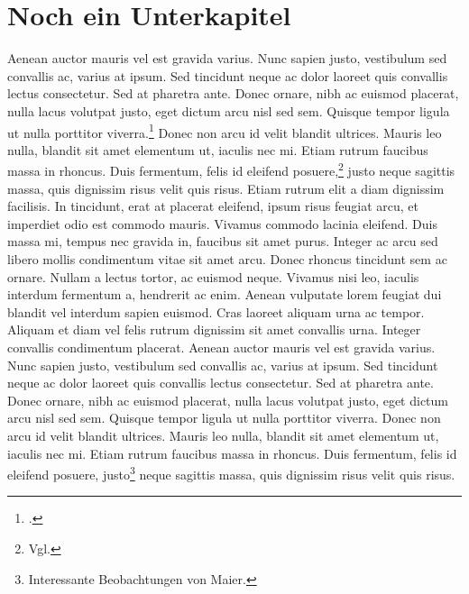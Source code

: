 \section{Noch ein Unterkapitel}
Aenean auctor mauris vel est gravida varius. Nunc sapien justo, vestibulum sed convallis ac, varius at ipsum. Sed tincidunt neque ac dolor laoreet quis convallis lectus consectetur. Sed at pharetra ante. Donec ornare, nibh ac euismod placerat, nulla lacus volutpat justo, eget dictum arcu nisl sed sem. Quisque tempor ligula ut nulla porttitor viverra.\footcite[50]{bizer_armenische_1969} Donec non arcu id velit blandit ultrices. Mauris leo nulla, blandit sit amet elementum ut, iaculis nec mi. Etiam rutrum faucibus massa in rhoncus. Duis fermentum, felis id eleifend posuere,\footnote{Vgl. } justo neque sagittis massa, quis dignissim risus velit quis risus.
%
{%
Etiam rutrum elit a diam dignissim facilisis. In tincidunt, erat at placerat eleifend, ipsum risus feugiat arcu, et imperdiet odio est commodo mauris. Vivamus commodo lacinia eleifend. Duis massa mi, tempus nec gravida in, faucibus sit amet purus. Integer ac arcu sed libero mollis condimentum vitae sit amet arcu. Donec rhoncus tincidunt sem ac ornare. Nullam a lectus tortor, ac euismod neque. Vivamus nisi leo, iaculis interdum fermentum a, hendrerit ac enim. Aenean vulputate lorem feugiat dui blandit vel interdum sapien euismod. Cras laoreet aliquam urna ac tempor. Aliquam et diam vel felis rutrum dignissim sit amet convallis urna. Integer convallis condimentum placerat.}
Aenean auctor mauris vel est gravida varius. Nunc sapien justo, vestibulum sed convallis ac, varius at ipsum. Sed tincidunt neque ac dolor laoreet quis convallis lectus consectetur. Sed at pharetra ante. Donec ornare, nibh ac euismod placerat, nulla lacus volutpat justo, eget dictum arcu nisl sed sem. Quisque tempor ligula ut nulla porttitor viverra. Donec non arcu id velit blandit ultrices. Mauris leo nulla, blandit sit amet elementum ut, iaculis nec mi. Etiam rutrum faucibus massa in rhoncus. Duis fermentum, felis id eleifend posuere, justo\footnote{Interessante Beobachtungen von Maier.} neque sagittis massa, quis dignissim risus velit quis risus.
